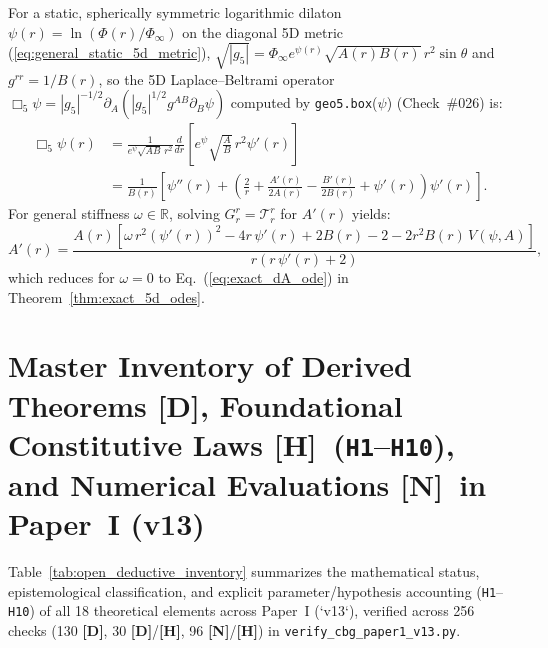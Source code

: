 \documentclass[11pt,a4paper]{article}
\newcommand{\catD}{\textbf{\textcolor{blue!75!black}{[D]}}}
\newcommand{\catH}{\textbf{\textcolor{orange!85!black}{[H]}}}
\newcommand{\catN}{\textbf{\textcolor{teal!75!black}{[N]}}}
\theoremstyle{definition}
\theoremstyle{remark}
\begin{document}
For a static, spherically symmetric logarithmic dilaton $\psi(r) = \ln(\Phi(r)/\Phi_{\infty})$ on the diagonal 5D metric (\ref{eq:general_static_5d_metric}), $\sqrt{|g_5|} = \Phi_{\infty}e^{\psi(r)}\sqrt{A(r)B(r)}\,r^2\sin\theta$ and $g^{rr} = 1/B(r)$, so the 5D Laplace--Beltrami operator $\Box_5\psi = |g_5|^{-1/2}\partial_A(|g_5|^{1/2}g^{AB}\partial_B\psi)$ computed by \texttt{geo5.box}($\psi$) (Check~\#026) is:
\begin{align}
  \Box_5\psi(r) &= \frac{1}{e^{\psi}\sqrt{A B}\,r^2}\frac{d}{dr}\!\left[e^{\psi}\sqrt{\frac{A}{B}}\,r^2\psi'(r)\right] \nonumber \\[3pt]
  &= \frac{1}{B(r)}\left[\psi''(r) + \left(\frac{2}{r} + \frac{A'(r)}{2 A(r)} - \frac{B'(r)}{2 B(r)} + \psi'(r)\right)\psi'(r)\right].
  \label{eq:appB_box5_psi}
\end{align}
For general stiffness $\omega \in \mathbb{R}$, solving $G^r_r = \mathcal{T}^r_r$ for $A'(r)$ yields:
\begin{equation}
  A'(r) = \frac{A(r)\left[\omega\,r^2\left(\psi'(r)\right)^2 - 4 r\,\psi'(r) + 2 B(r) - 2 - 2 r^2 B(r)\,V(\psi,A)\right]}{r\left(r\,\psi'(r) + 2\right)},
  \label{eq:appB_dA_general_omega}
\end{equation}
which reduces for $\omega = 0$ to Eq.~(\ref{eq:exact_dA_ode}) in Theorem~\ref{thm:exact_5d_odes}.

\section{\texorpdfstring{Master Inventory of Derived Theorems \catD, Foundational Constitutive Laws \catH\ (\texttt{H1}--\texttt{H10}), and Numerical Evaluations \catN\ in Paper~I (v13)}{Master Inventory of Derived Theorems, Foundational Constitutive Laws, and Numerical Evaluations in Paper I (v13)}}
\label{app:open_deductive_program}

Table~\ref{tab:open_deductive_inventory} summarizes the mathematical status, epistemological classification, and explicit parameter/hypothesis accounting (\texttt{H1}--\texttt{H10}) of all 18 theoretical elements across Paper~I (`v13`), verified across 256 checks (130 \catD, 30 \catD/\catH, 96 \catN/\catH) in \texttt{verify\_cbg\_paper1\_v13.py}.
\end{document}
